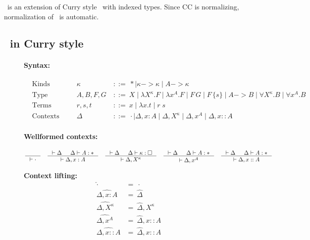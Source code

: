 \section{\Fi}
\Fi\ is an extension of Curry style \Fw\ with indexed types.
Since CC is normalizing, normalization of \Fi\ is automatic.

\subsection{\Fi\ in Curry style}
\begin{figure}
\paragraph{Syntax:}
\begin{align*}
&\text{Kinds}
 	& \kappa		&~ ::= ~ *
				\mid \kappa -> \kappa
				\mid A -> \kappa
\\
&\text{Type Constructors}
	& A,B,F,G		&~ ::= ~ X
				\mid \lambda X^\kappa.F
				\mid \lambda x^A.F
				\mid F\,G
				\mid F\,\{s\}
				\mid A -> B
				\mid \forall X^\kappa . B
				\mid \forall x^A . B
\\
&\text{Terms}
	& r,s,t			&~ ::= ~ x \mid \lambda x.t \mid r\;s
\\
&\text{Contexts}
	& \Delta		&~ ::= ~ \cdot
				\mid \Delta, x : A
				\mid \Delta, X^\kappa
				\mid \Delta, x^A
				\mid \Delta, x :: A
\end{align*}

\paragraph{Wellformed contexts:}
\[ \inference{}{|- \cdot}
 ~~~
   \inference{|- \Delta & \Delta |- A:*}{|- \Delta,x:A}
 ~~~
   \inference{|- \Delta & \Delta |- \kappa:\square}{|- \Delta,X^\kappa}
 ~~~
   \inference{|- \Delta & \Delta |- A:*}{|- \Delta,x^A}
 ~~~
   \inference{|- \Delta & \Delta |- A:*}{|- \Delta,x::A}
\]

\noindent
\begin{minipage}{.5\textwidth}
\textbf{Context lifting:}\vspace*{-.5em}
\begin{align*}
\hat\cdot &=~ \cdot \\
\widehat{\Delta,x:A} &=~ \hat\Delta \\
\widehat{\Delta,X^\kappa} &=~ \hat\Delta,X^\kappa \\
\widehat{\Delta,x^A} &=~ \hat\Delta,x::A \\
\widehat{\Delta,x::A} &=~ \hat\Delta,x::A
\end{align*}
\end{minipage}
\begin{minipage}{.5\textwidth}

\end{minipage}
\end{figure}
